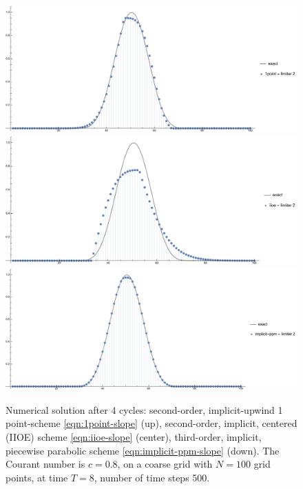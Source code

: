 \documentclass[../thesis.tex]{subfiles}
\begin{document}
\begin{figure}[H]
	\centering
	\includegraphics[width=\textwidth]{fig-1point-c0p8-T8-limit2-smooth.pdf}
	\includegraphics[width=\textwidth]{fig-iioe-c0p8-T8-limit2-smooth.pdf}
	\includegraphics[width=\textwidth]{fig-implicit-ppm-c0p8-T8-limit2-smooth.pdf}
	\caption{Numerical solution after 4 cycles: second-order, implicit-upwind 1 point-scheme \eqref{eqn:1point-slope} (up), second-order, implicit, centered (IIOE) scheme \eqref{eqn:iioe-slope} (center), third-order, implicit, piecewise parabolic scheme \eqref{eqn:implicit-ppm-slope} (down). The Courant number is \(c = 0.8\), on a coarse grid with \(N = 100\) grid points, at time \(T = 8\), number of time steps 500.}
	\label{fig:c0p8-T8-limit2-smooth}
\end{figure}
\end{document}
